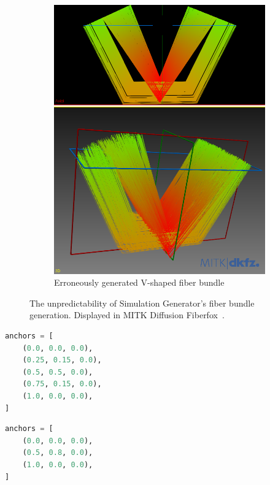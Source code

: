 \documentclass{article}
\begin{document}
\begin{figure}[!h]
\begin{subfigure}[b]{0.4\textwidth}
      \includegraphics[width=\textwidth]{sim_gen__v_shape__bad}
      \caption{Erroneously generated V-shaped fiber bundle}
      \label{fig:f1-b}
    \end{subfigure}
    \caption{The unpredictability of Simulation Generator's fiber bundle generation. Displayed in MITK Diffusion Fiberfox~\cite{neher2014fiberfox}.}
    \label{fig:f1}
  \end{figure}

  \noindent
  \begin{minipage}[t]{.45\textwidth}
    \begin{lstlisting}[language=Python, caption={Centroid anchors used to generate the fiber bundle in Figure~\ref{fig:f1-a}}, label={lst:l1}]
anchors = [
    (0.0, 0.0, 0.0),
    (0.25, 0.15, 0.0),
    (0.5, 0.5, 0.0),
    (0.75, 0.15, 0.0),
    (1.0, 0.0, 0.0),
]   \end{lstlisting}
  \end{minipage}
  \hfill
  \begin{minipage}[t]{.45\textwidth}
    \begin{lstlisting}[language=Python, caption={Centroid anchors used to generate the fiber bundle in Figure~\ref{fig:f1-b}}, label={lst:l2}]
anchors = [
    (0.0, 0.0, 0.0),
    (0.5, 0.8, 0.0),
    (1.0, 0.0, 0.0),
]   \end{lstlisting}
  \end{minipage}
\end{document}
